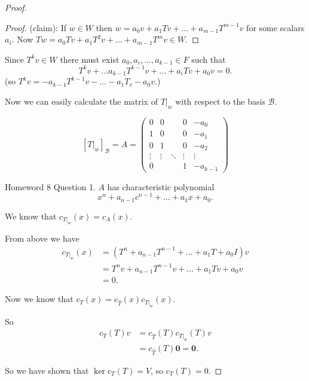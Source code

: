 \documentclass{article}
\theoremstyle{definition} \newtheorem*{definition}{Definition}
\newcommand{\B}{\mathcal{B}}
\renewcommand{\vec}[1]{\mathbf{#1}}
\begin{document}
\begin{proof}
    \begin{proof}
      (claim):
      If $w\in W$ then $w = a_0v + a_1Tv + \dots + a_{m-1}T^{m-1}v$ for 
      some scalars $a_i$. Now
      $Tw = a_0 Tv + a_1 T^2v + \dots + a_{m-1}T^mv \in W$.
    \end{proof}

    Since $T^kv \in W$ there must exist $a_0,a_i, \dots, a_{k-1} \in F$
    such that $$T^kv + \dots a_{k-1}T^{k-1}v + \dots +a_iTv + a_0v = 0.$$    (so $T^kv = -a_{k-1}T^{k-1}v  - \dots - a_1 T_v - a_0v.$)

    Now we can easily calculate the matrix of $T|_w$ with respect to
    the basis $\B$.

    \[
      [T|_w]_\B =A= \left( 
        \begin{matrix}
          0       & 0       & & 0       & -a_0      \\  
          1       & 0       & & 0       & -a_1      \\
          0       & 1       &  & 0       & -a_2      \\
          \vdots  & \vdots  & \ddots & \vdots  & \vdots    \\
          0       &         & & 1       & -a_{k-1}
        \end{matrix}
      \right)
    \]

    Homeword 8 Question 1. $A$ has characteristic polynomial 
    \[
      x^n + a_{n-1}c^{n-1} + \dots + a_1 x + a_0.
    \]

  We know that $c_{T|_w}(x) = c_A(x)$.

  From above we have
  \begin{align*}
    c_{T|_w}(x) &= \left( T^n + a_{n-1}T^{n-1} + \dots + a_1 T + a_0 I
    \right)v\\
    &= T^nv + a_{n-1}T^{n-1}v + \dots + a_1 Tv + a_0 v \\
    &= 0.
  \end{align*}

  Now we know that $c_T(x) = c_{\hat{T}}(x)c_{T|_w}(x)$.

  So 
\begin{align*}
  c_T(T)v  &= c_{\hat{T}}(T)c_{T|_w}(T)v \\
  &= c_{\hat{T}}(T) \vec{0} = \vec{0}.
\end{align*}

So we have shown that $\ker c_T(T) = V$, so $c_T(T) = 0$.

  \end{proof}
  
\end{document}
